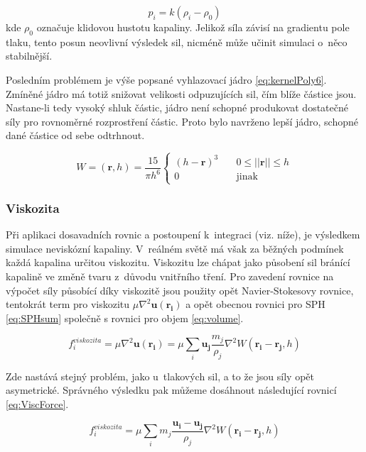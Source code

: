 \begin{equation}
	p_i = k(\rho_i - \rho_0)
	\label{eq:idealGasRest}
\end{equation}
kde $\rho_0$ označuje klidovou hustotu kapaliny. Jelikož síla závisí na gradientu pole tlaku, tento posun neovlivní výsledek sil, nicméně může učinit simulaci o~něco stabilnější.

Posledním problémem je výše popsané vyhlazovací jádro \ref{eq:kernelPoly6}. Zmíněné jádro má totiž snižovat velikosti odpuzujících sil, čím blíže částice jsou. Nastane-li tedy vysoký shluk částic, jádro není schopné produkovat dostatečné síly pro rovnoměrné rozprostření částic. Proto bylo navrženo \cite{Desbrun96} lepší jádro, schopné dané částice od sebe odtrhnout.

\begin{equation}
	W = (\mathbf{r}, h) = \frac{15}{\pi h^6}
	\begin{cases}
		(h - \mathbf{r})^3 & \quad 0 \leq ||\mathbf{r}|| \leq h \\
		0                  & \quad \text{jinak}
	\end{cases}
	\label{eq:pressureKernel}
\end{equation}

\subsubsection{Viskozita}
Při aplikaci dosavadních rovnic a postoupení k~integraci (viz. níže), je výsledkem simulace neviskózní kapaliny. V~reálném světě má však za běžných podmínek každá kapalina určitou viskozitu. Viskozitu lze chápat jako působení sil bránící kapalině ve změně tvaru z~důvodu vnitřního tření. Pro zavedení rovnice na výpočet síly působící díky viskozitě jsou použity opět Navier-Stokesovy rovnice, tentokrát term pro viskozitu $\mu \nabla^2\mathbf{u}(\mathbf{r_i})$ a opět obecnou rovnici pro SPH \ref{eq:SPHsum} společně s rovnici pro objem \ref{eq:volume}.

\begin{equation}
	f^{viskozita}_i = \mu \nabla^2\mathbf{u}(\mathbf{r_i}) = \mu \sum_i \mathbf{u_j} \frac{m_j}{\rho_j} \nabla^2 W(\mathbf{r_i} - \mathbf{r_j},h)
\end{equation}

Zde nastává stejný problém, jako u~tlakových sil, a to že jsou síly opět asymetrické. Správného výsledku pak můžeme dosáhnout následující rovnicí \ref{eq:ViscForce}. \cite{Muller03}

\begin{equation}
	f^{viskozita}_i = \mu \sum_i m_j \frac{\mathbf{u_i} - \mathbf{u_j}}{\rho_j} \nabla^2 W(\mathbf{r_i} - \mathbf{r_j},h)
	\label{eq:ViscForce}
\end{equation}

